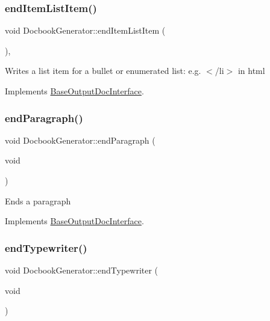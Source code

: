 \mbox{\label{class_docbook_generator_a6a0d36a22a9ca268b716cd37a4ab13b0}} 
\subsubsection{\texorpdfstring{endItemListItem()}{endItemListItem()}}
{\footnotesize\ttfamily void Docbook\+Generator\+::end\+Item\+List\+Item (\begin{DoxyParamCaption}{ }\end{DoxyParamCaption})\hspace{0.3cm}{\ttfamily [inline]}, {\ttfamily [virtual]}}

Writes a list item for a bullet or enumerated list\+: e.\+g. {\ttfamily $<$/li$>$} in html 

Implements \mbox{\hyperlink{class_base_output_doc_interface_a90d290d7a06a9e7ecd968c8da90ed665}{Base\+Output\+Doc\+Interface}}.

\mbox{\label{class_docbook_generator_a6f793e8c29984f0ed8d654e9b89110e3}} 
\subsubsection{\texorpdfstring{endParagraph()}{endParagraph()}}
{\footnotesize\ttfamily void Docbook\+Generator\+::end\+Paragraph (\begin{DoxyParamCaption}\item[{void}]{ }\end{DoxyParamCaption})\hspace{0.3cm}{\ttfamily [virtual]}}

Ends a paragraph 

Implements \mbox{\hyperlink{class_base_output_doc_interface_ab76280c2eb451ad160991707206b6c95}{Base\+Output\+Doc\+Interface}}.

\mbox{\label{class_docbook_generator_a2b987c6b42a8a5b5cea28f950fefa6cc}} 
\subsubsection{\texorpdfstring{endTypewriter()}{endTypewriter()}}
{\footnotesize\ttfamily void Docbook\+Generator\+::end\+Typewriter (\begin{DoxyParamCaption}\item[{void}]{ }\end{DoxyParamCaption})\hspace{0.3cm}{\ttfamily [virtual]}}

